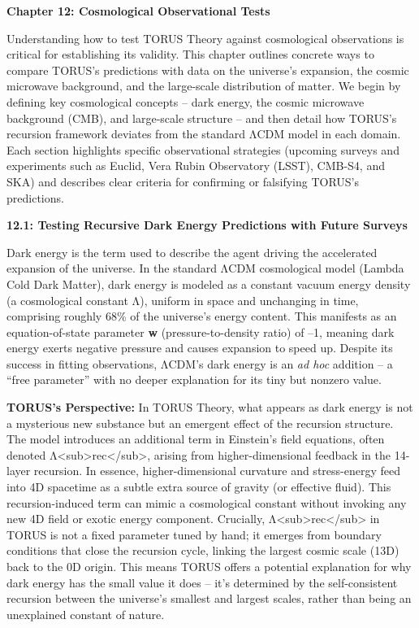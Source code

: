 \documentclass[
]{article}
\author{}
\date{}
\begin{document}
\textbf{Chapter 12: Cosmological Observational Tests}

Understanding how to test TORUS Theory against cosmological observations
is critical for establishing its validity. This chapter outlines
concrete ways to compare TORUS's predictions with data on the universe's
expansion, the cosmic microwave background, and the large-scale
distribution of matter. We begin by defining key cosmological concepts
-- dark energy, the cosmic microwave background (CMB), and large-scale
structure -- and then detail how TORUS's recursion framework deviates
from the standard ΛCDM model in each domain. Each section highlights
specific observational strategies (upcoming surveys and experiments such
as Euclid, Vera Rubin Observatory (LSST), CMB-S4, and SKA) and describes
clear criteria for confirming or falsifying TORUS's predictions.

\textbf{12.1: Testing Recursive Dark Energy Predictions with Future
Surveys}

Dark energy is the term used to describe the agent driving the
accelerated expansion of the universe. In the standard ΛCDM cosmological
model (Lambda Cold Dark Matter), dark energy is modeled as a constant
vacuum energy density (a cosmological constant Λ), uniform in space and
unchanging in time, comprising roughly 68\% of the universe's energy
content. This manifests as an equation-of-state parameter \textbf{w}
(pressure-to-density ratio) of --1, meaning dark energy exerts negative
pressure and causes expansion to speed up. Despite its success in
fitting observations, ΛCDM's dark energy is an \emph{ad hoc} addition --
a ``free parameter'' with no deeper explanation for its tiny but nonzero
value.

\textbf{TORUS's Perspective:} In TORUS Theory, what appears as dark
energy is not a mysterious new substance but an emergent effect of the
recursion structure. The model introduces an additional term in
Einstein's field equations, often denoted
Λ\textless sub\textgreater rec\textless/sub\textgreater, arising from
higher-dimensional feedback in the 14-layer recursion. In essence,
higher-dimensional curvature and stress-energy feed into 4D spacetime as
a subtle extra source of gravity (or effective fluid). This
recursion-induced term can mimic a cosmological constant without
invoking any new 4D field or exotic energy component. Crucially,
Λ\textless sub\textgreater rec\textless/sub\textgreater{} in TORUS is
not a fixed parameter tuned by hand; it emerges from boundary conditions
that close the recursion cycle, linking the largest cosmic scale (13D)
back to the 0D origin. This means TORUS offers a potential explanation
for why dark energy has the small value it does -- it's determined by
the self-consistent recursion between the universe's smallest and
largest scales, rather than being an unexplained constant of nature.
\end{document}
